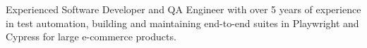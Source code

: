 \documentclass[letter,10pt]{article}
\begin{document}

  Experienced Software Developer and QA Engineer with over 5 years of experience in test automation, building and maintaining end-to-end suites in Playwright and Cypress for large e-commerce products.
\end{document}
